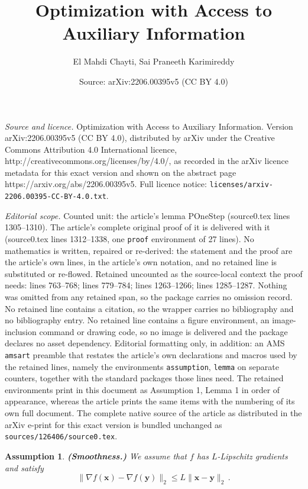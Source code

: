 \documentclass[10pt,a4paper]{amsart}
\title{\centering Optimization with Access to Auxiliary Information}
\author{El Mahdi Chayti, Sai Praneeth Karimireddy}
\date{Source: arXiv:2206.00395v5 (CC BY 4.0)}
\newtheorem{assumption}{Assumption}
\newcommand{\norm}[1]{\|#1\|_2}
\def\vx{{\bm{x}}}
\def\vy{{\bm{y}}}
\begin{document}
\maketitle

\noindent\emph{Source and licence.} \centering Optimization with Access to Auxiliary Information. Version arXiv:2206.00395v5 (CC BY 4.0), distributed by arXiv under the Creative Commons Attribution 4.0 International licence, http://creativecommons.org/licenses/by/4.0/, as recorded in the arXiv licence metadata for this exact version and shown on the abstract page https://arxiv.org/abs/2206.00395v5. Full licence notice: \texttt{licenses/arxiv-2206.00395-CC-BY-4.0.txt}.\par\smallskip

\noindent\textit{Editorial scope.} Counted unit: the article's lemma POneStep (source0.tex lines 1305--1310). The article's complete original proof of it is delivered with it (source0.tex lines 1312--1338, one \texttt{proof} environment of 27 lines). No mathematics is written, repaired or re-derived: the statement and the proof are the article's own lines, in the article's own notation, and no retained line is substituted or re-flowed.  Retained uncounted as the source-local context the proof needs: lines 763--768; lines 779--784; lines 1263--1266; lines 1285--1287.  Nothing was omitted from any retained span, so the package carries no omission record.  No retained line contains a citation, so the wrapper carries no bibliography and no bibliography entry.  No retained line contains a figure environment, an image-inclusion command or drawing code, so no image is delivered and the package declares no asset dependency.  Editorial formatting only, in addition: an AMS \texttt{amsart} preamble that restates the article's own declarations and macros used by the retained lines, namely the environments \texttt{assumption}, \texttt{lemma} on separate counters, together with the standard packages those lines need.  The retained environments print in this document as Assumption 1, Lemma 1 in order of appearance, whereas the article prints the same items with the numbering of its own full document.  The complete native source of the article as distributed in the arXiv e-print for this exact version is bundled unchanged as \texttt{sources/126406/source0.tex}.
\begin{assumption}\label{A1}
\textbf{(Smoothness.)} We assume that $f$ has $L$-Lipschitz gradients and satisfy
    \begin{equation*}\label{eqn:smoothness}
        \norm{\nabla f(\vx) - \nabla f(\vy)} \leq L \norm{\vx - \vy}\,.
    \end{equation*}
\end{assumption}
\end{document}
